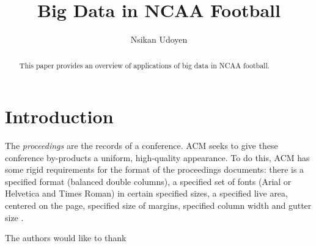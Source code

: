 \documentclass[sigconf]{acmart}
\begin{document}
\title{Big Data in NCAA Football}


\author{Nsikan Udoyen}

\renewcommand{\shortauthors}{N. Udoyen et al.}


\begin{abstract}
This paper provides an overview of applications of big data in NCAA football.
\end{abstract}



\maketitle

\section{Introduction}

The \textit{proceedings} are the records of a
conference. ACM seeks to give these
conference by-products a uniform, high-quality appearance.  To do
this, ACM has some rigid requirements for the format of the
proceedings documents: there is a specified format (balanced double
columns), a specified set of fonts (Arial or Helvetica and Times
Roman) in certain specified sizes, a specified live area, centered on
the page, specified size of margins, specified column width and gutter
size \cite{editor00}.


\begin{acks}

  The authors would like to thank 

\end{acks}


 
\end{document}

